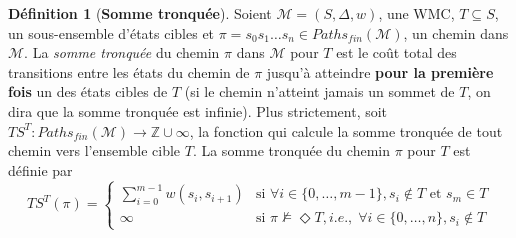\documentclass[12pt,a4paper]{report}
\theoremstyle{definition}%
\newtheorem{definition}{Définition}[chapter]
\theoremstyle{remark}
\newcommand{\ie}{\textit{i.e.}, }
\begin{document}
\begin{definition}[\textbf{Somme tronquée}]
	Soient $\mathcal{M} = (S, \Delta, w)$, une WMC, $T \subseteq S$, un sous-ensemble d'états cibles et $\pi = s_0s_1 \dots s_{n} \in Paths_{fin}(\mathcal{M})$, un chemin dans $\mathcal{M}$. La \textit{somme tronquée} du chemin $\pi$ dans $\mathcal{M}$ pour $T$ est le coût total des transitions entre les états du chemin de $\pi$ jusqu'à atteindre \textbf{pour la première fois} un des états cibles de $T$ (si le chemin n'atteint jamais un sommet de $T$, on dira que la somme tronquée est infinie).
	Plus strictement,
	soit $TS^T : Paths_{fin}(\mathcal{M}) \rightarrow \mathbb{Z} \cup \infty$, la fonction qui calcule la somme tronquée de tout chemin vers l'ensemble cible $T$. La somme tronquée du chemin $\pi$ pour $T$ est définie par 
	\[
		TS^T(\pi) =
		\begin{cases}
			\sum_{i = 0}^{m-1} w(s_i, s_{i+1}) & \text{si } \forall i \in \{0, \dots, m - 1\}, s_i \notin T \text{ et } s_m \in T \\
			\infty & \text{si } \pi \not \models \Diamond T, \ie \; \forall i \in \{0, \dots, n\}, s_i \notin T
		\end{cases}
	\]
\end{definition}

{}

\end{document}
